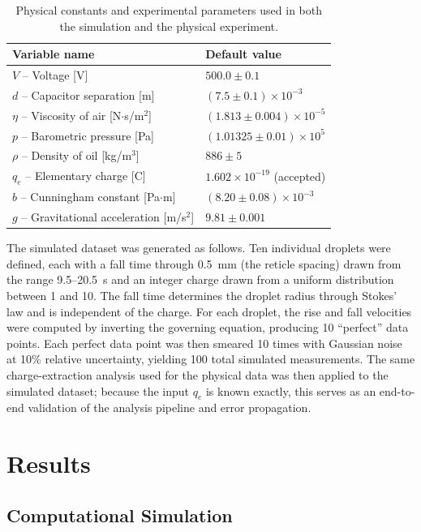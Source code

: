 \documentclass[%
 reprint,
 amsmath,amssymb,
 aps,
]{revtex4-2}
\begin{document}
\begin{table}[h]
\centering
\begin{tabular}{|l|l|}
\hline
\textbf{Variable name} & \textbf{Default value} \\
\hline
$V$ -- Voltage [V] & $500.0 \pm 0.1$ \\
\hline
$d$ -- Capacitor separation [m] & $(7.5 \pm 0.1) \times 10^{-3}$ \\
\hline
$\eta$ -- Viscosity of air [N$\cdot$s/m$^2$] & $(1.813 \pm 0.004) \times 10^{-5}$ \\
\hline
$p$ -- Barometric pressure [Pa] & $(1.01325 \pm 0.01) \times 10^{5}$ \\
\hline
$\rho$ -- Density of oil [kg/m$^3$] & $886 \pm 5$ \\
\hline
$q_e$ -- Elementary charge [C] & $1.602 \times 10^{-19}$ (accepted) \\
\hline
$b$ -- Cunningham constant [Pa$\cdot$m] & $(8.20 \pm 0.08) \times 10^{-3}$ \\
\hline
$g$ -- Gravitational acceleration [m/s$^2$] & $9.81 \pm 0.001$ \\
\hline
\end{tabular}
\caption{Physical constants and experimental parameters used in both the simulation and the physical experiment.}
\label{tab:params}
\end{table}

The simulated dataset was generated as follows. Ten individual droplets were defined, each with a fall time through 0.5~mm (the reticle spacing) drawn from the range 9.5--20.5~s and an integer charge drawn from a uniform distribution between 1 and 10. The fall time determines the droplet radius through Stokes' law and is independent of the charge. For each droplet, the rise and fall velocities were computed by inverting the governing equation, producing 10 ``perfect'' data points. Each perfect data point was then smeared 10 times with Gaussian noise at 10\% relative uncertainty, yielding 100 total simulated measurements. The same charge-extraction analysis used for the physical data was then applied to the simulated dataset; because the input \(q_e\) is known exactly, this serves as an end-to-end validation of the analysis pipeline and error propagation.
\section{Results}
\subsection{Computational Simulation}
\end{document}
